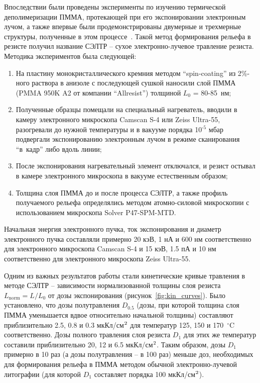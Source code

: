 Впоследствии были проведены эксперименты по изучению термической деполимеризации ПММА, протекающей при его экспонировании электронным лучом, а также впервые были продемонстрированы двумерные и трехмерные структуры, полученные в этом процессе~\cite{Bruk_2013}. Такой метод формирования рельефа в резисте получил название СЭЛТР -- сухое электронно-лучевое травление резиста. Методика экспериментов была следующей:
\begin{enumerate}
	\item На пластину монокристаллического кремния методом ``spin-coating'' из 2\%-ного раствора в анизоле с последующей сушкой наносили слой \linebreak ПММА (PMMA 950K A2 от компании ``Allresist'') толщиной \linebreak $L_0$ = 80-85~нм;
	\item Полученные образцы помещали на специальный нагреватель, вводили в камеру электронного микроскопа Camscan S-4 или Zeiss Ultra-55, разогревали до нужной температуры и в вакууме порядка 10$^\text{-5}$ мбар подвергали экспонированию электронным лучом в режиме сканирования ``в~кадр'' либо вдоль линии;
	\item После экспонирования нагревательный элемент отключался, и резист остывал в камере электронного микроскопа в вакууме естественным образом;
	\item Толщина слоя ПММА до и после процесса СЭЛТР, а также профиль получаемого рельефа определялись методом атомно-силовой микроскопии с использованием микроскопа Solver P47-SPM-MTD.
\end{enumerate}

Начальная энергия электронного пучка, ток экспонирования и диаметр электронного пучка составляли примерно 20 кэВ, 1 нА и 600 нм соответственно для электронного микроскопа Camscan S-4 и 15 кэВ, 1.5 пА и 10 нм соответственно для электронного микроскопа Zeiss Ultra-55.

Одним из важных результатов работы стали кинетические кривые травления в методе СЭЛТР -- зависимости нормализованной толщины слоя резиста $L_\mathrm{norm} = L/L_0$ от дозы экспонирования (рисунок~\ref{fig:kin_curves}). Было установлено, что дозы полутравления $D_\text{0.5}$ (дозы, при которой толщина слоя ПММА уменьшается вдвое относительно начальной толщины) составляют приблизительно 2.5, 0.8 и 0.3 мкКл/см$^\text{2}$ для температур 125, 150 и 170~$^\circ$C соответственно. Дозы полного травления слоя резиста $D_\text{1}$ для этих же температур составили приблизительно 20, 12 и 6.5 мкКл/см$^\text{2}$. Таким образом, дозы $D_\text{1}$ примерно в 10 раз (а дозы полутравления -- в 100 раз) меньше доз, необходимых для формирования рельефа в ПММА методом обычной электронно-лучевой литографии (для которой $D_\text{1}$ составляет порядка 100 мкКл/см$^\text{2}$).

